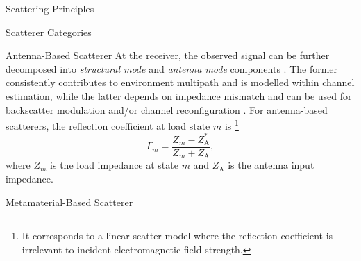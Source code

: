 \documentclass[journal]{IEEEtran}
\begin{document}
\begin{section}{Scattering Principles}
\begin{subsection}{Scatterer Categories}
\begin{subsubsection}{Antenna-Based Scatterer}
			At the receiver, the observed signal can be further decomposed into \emph{structural mode} and \emph{antenna mode} components \cite{Hansen1989}.
			The former consistently contributes to environment multipath and is modelled within channel estimation, while the latter depends on impedance mismatch and can be used for backscatter modulation \cite{Boyer2014} and/or channel reconfiguration \cite{Liang2022}.
			For antenna-based scatterers, the reflection coefficient at load state $m$ is%
			\footnote{It corresponds to a linear scatter model where the reflection coefficient is irrelevant to incident electromagnetic field strength.}
			\begin{equation}
				\Gamma_m = \frac{Z_m - Z_{\mathrm{A}}^*}{Z_m + Z_{\mathrm{A}}},
				\label{eq:reflection_coefficient}
			\end{equation}
			where $Z_m$ is the load impedance at state $m$ and $Z_{\mathrm{A}}$ is the antenna input impedance.
		\end{subsubsection}
		\begin{subsubsection}{Metamaterial-Based Scatterer}



\end{subsubsection}
\end{subsection}
\end{section}
\end{document}
